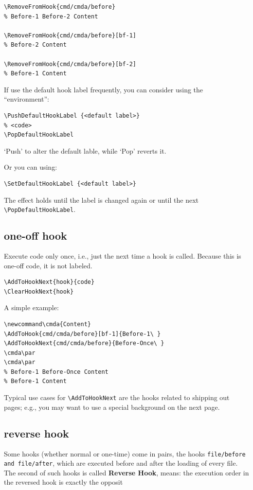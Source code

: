 \documentclass{article}
\newcommand\tbh{\textbackslash}
\newcommand\cmda{Content}
\begin{document}
\begin{lstlisting}
\RemoveFromHook{cmd/cmda/before}
% Before-1 Before-2 Content

\RemoveFromHook{cmd/cmda/before}[bf-1]
% Before-2 Content

\RemoveFromHook{cmd/cmda/before}[bf-2]
% Before-1 Content
\end{lstlisting}

If use the default hook label frequently, you can consider using the ``environment'':
\begin{lstlisting}
\PushDefaultHookLabel {<default label>}
% <code>
\PopDefaultHookLabel
\end{lstlisting}

`Push' to alter the default lable, while `Pop' reverts it.

Or you can using:
\begin{lstlisting}
\SetDefaultHookLabel {<default label>}
\end{lstlisting}

The effect holds until the label is changed again or until the next \texttt{\tbh PopDefaultHookLabel}.

\subsection{one-off hook}
Execute code only once, i.e., just the next time a hook is called. Because this is one-off code, it is
not labeled.
\begin{lstlisting}
\AddToHookNext{hook}{code}
\ClearHookNext{hook}
\end{lstlisting}

A simple example:
\begin{lstlisting}
\newcommand\cmda{Content}
\AddToHook{cmd/cmda/before}[bf-1]{Before-1\ }
\AddToHookNext{cmd/cmda/before}{Before-Once\ }
\cmda\par
\cmda\par
% Before-1 Before-Once Content
% Before-1 Content
\end{lstlisting}

Typical use cases for \texttt{\tbh AddToHookNext} are the hooks related
to shipping out pages; e.g., you may want to use a special background on the next
page.

\subsection{reverse hook}
Some hooks (whether normal or one-time) come in pairs, the hooks
\texttt{file/before and file/after}, which are executed before and after the loading of
every file. The second of such hooks is called \textbf{Reverse Hook}, means: the execution
order in the reversed hook is exactly the opposit
\end{document}
